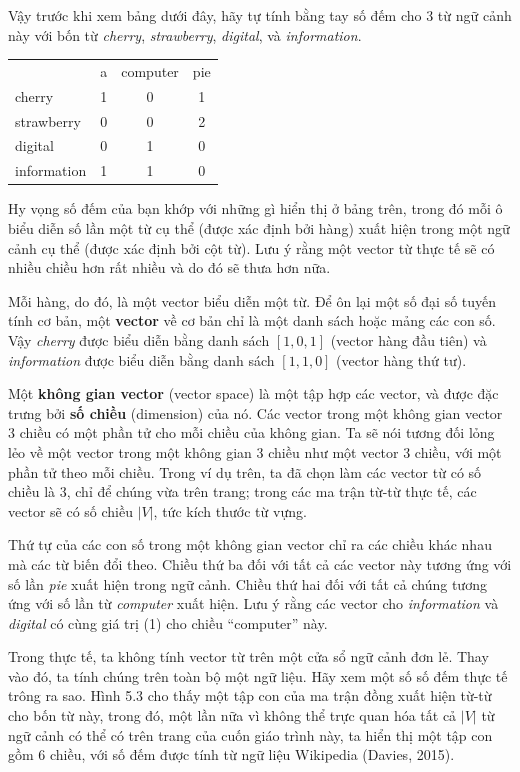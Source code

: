 Vậy trước khi xem bảng dưới đây, hãy tự tính bằng tay số đếm cho 3 từ ngữ cảnh này với bốn từ \emph{cherry}, \emph{strawberry}, \emph{digital}, và \emph{information}.

\begin{center}
\begin{tabular}{lccc}
 & a & computer & pie \\
cherry & 1 & 0 & 1 \\
strawberry & 0 & 0 & 2 \\
digital & 0 & 1 & 0 \\
information & 1 & 1 & 0 \\
\end{tabular}
\end{center}

Hy vọng số đếm của bạn khớp với những gì hiển thị ở bảng trên, trong đó mỗi ô biểu diễn số lần một từ cụ thể (được xác định bởi hàng) xuất hiện trong một ngữ cảnh cụ thể (được xác định bởi cột từ). Lưu ý rằng một vector từ thực tế sẽ có nhiều chiều hơn rất nhiều và do đó sẽ thưa hơn nữa.

Mỗi hàng, do đó, là một vector biểu diễn một từ. Để ôn lại một số đại số tuyến tính cơ bản, một \textbf{vector} về cơ bản chỉ là một danh sách hoặc mảng các con số. Vậy \emph{cherry} được biểu diễn bằng danh sách $[1,0,1]$ (vector hàng đầu tiên) và \emph{information} được biểu diễn bằng danh sách $[1,1,0]$ (vector hàng thứ tư).

Một \textbf{không gian vector} (vector space) là một tập hợp các vector, và được đặc trưng bởi \textbf{số chiều} (dimension) của nó. Các vector trong một không gian vector 3 chiều có một phần tử cho mỗi chiều của không gian. Ta sẽ nói tương đối lỏng lẻo về một vector trong một không gian 3 chiều như một vector 3 chiều, với một phần tử theo mỗi chiều. Trong ví dụ trên, ta đã chọn làm các vector từ có số chiều là 3, chỉ để chúng vừa trên trang; trong các ma trận từ-từ thực tế, các vector sẽ có số chiều $|V|$, tức kích thước từ vựng.

Thứ tự của các con số trong một không gian vector chỉ ra các chiều khác nhau mà các từ biến đổi theo. Chiều thứ ba đối với tất cả các vector này tương ứng với số lần \emph{pie} xuất hiện trong ngữ cảnh. Chiều thứ hai đối với tất cả chúng tương ứng với số lần từ \emph{computer} xuất hiện. Lưu ý rằng các vector cho \emph{information} và \emph{digital} có cùng giá trị (1) cho chiều ``computer'' này.

Trong thực tế, ta không tính vector từ trên một cửa sổ ngữ cảnh đơn lẻ. Thay vào đó, ta tính chúng trên toàn bộ một ngữ liệu. Hãy xem một số số đếm thực tế trông ra sao. Hình 5.3 cho thấy một tập con của ma trận đồng xuất hiện từ-từ cho bốn từ này, trong đó, một lần nữa vì không thể trực quan hóa tất cả $|V|$ từ ngữ cảnh có thể có trên trang của cuốn giáo trình này, ta hiển thị một tập con gồm 6 chiều, với số đếm được tính từ ngữ liệu Wikipedia (Davies, 2015).

